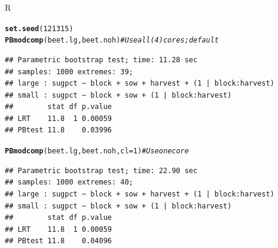 \documentclass[compress]{beamer}\usepackage[]{graphicx}\usepackage[]{color}
\makeatletter
\newcommand{\hlnum}[1]{\textcolor[rgb]{0.686,0.059,0.569}{#1}}%
\newcommand{\hlcom}[1]{\textcolor[rgb]{0.678,0.584,0.686}{\textit{#1}}}%
\newcommand{\hlstd}[1]{\textcolor[rgb]{0.345,0.345,0.345}{#1}}%
\newcommand{\hlkwc}[1]{\textcolor[rgb]{0.333,0.667,0.333}{#1}}%
\newcommand{\hlkwd}[1]{\textcolor[rgb]{0.737,0.353,0.396}{\textbf{#1}}}%
\newenvironment{kframe}{%
 \def\at@end@of@kframe{}%
 \ifinner\ifhmode%
  \def\at@end@of@kframe{\end{minipage}}%
  \begin{minipage}{\columnwidth}%
 \fi\fi%
 \def\FrameCommand##1{\hskip\@totalleftmargin \hskip-\fboxsep
 \colorbox{shadecolor}{##1}\hskip-\fboxsep
     \hskip-\linewidth \hskip-\@totalleftmargin \hskip\columnwidth}%
 \MakeFramed {\advance\hsize-\width
   \@totalleftmargin\z@ \linewidth\hsize
   \@setminipage}}%
 {\par\unskip\endMakeFramed%
 \at@end@of@kframe}
\newenvironment{knitrout}{}{} %
\newenvironment{sframe}
{\begin{frame} [containsverbatim] }
  {\end{frame}}
\newenvironment{sblock}
{\begin{block}{R}}
  {\end{block}}
\makeatother
\begin{document}
\begin{sframe}
\begin{sblock}
\begin{knitrout}\scriptsize
{}\color{fgcolor}\begin{kframe}
\begin{alltt}
\hlkwd{set.seed}\hlstd{(}\hlnum{121315}\hlstd{)}
\hlkwd{PBmodcomp}\hlstd{(beet.lg, beet.noh)} \hlcom{# Use all (4) cores; default}
\end{alltt}
\begin{verbatim}
## Parametric bootstrap test; time: 11.28 sec
## samples: 1000 extremes: 39;
## large : sugpct ~ block + sow + harvest + (1 | block:harvest)
## small : sugpct ~ block + sow + (1 | block:harvest)
##        stat df p.value
## LRT    11.8  1 0.00059
## PBtest 11.8    0.03996
\end{verbatim}
\begin{alltt}
\hlkwd{PBmodcomp}\hlstd{(beet.lg, beet.noh,} \hlkwc{cl}\hlstd{=}\hlnum{1}\hlstd{)} \hlcom{# Use one core}
\end{alltt}
\begin{verbatim}
## Parametric bootstrap test; time: 22.90 sec
## samples: 1000 extremes: 40;
## large : sugpct ~ block + sow + harvest + (1 | block:harvest)
## small : sugpct ~ block + sow + (1 | block:harvest)
##        stat df p.value
## LRT    11.8  1 0.00059
## PBtest 11.8    0.04096
\end{verbatim}
\end{kframe}
\end{knitrout}
\end{sblock}  
\end{sframe}
\end{document}
